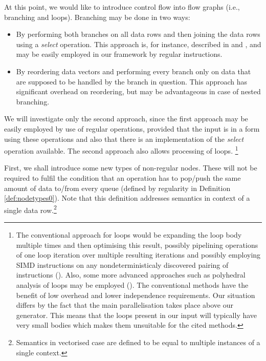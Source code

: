 \label{sec:analysis}

At this point, we would like to introduce control flow into flow graphs (i.e., branching and loops). Branching may be done in two ways:

\label{sec:branching}
\begin{itemize}
  \item By performing both branches on all data rows and then joining the data rows using a \emph{select} operation. This approach is, for instance, described in \cite{select} and \cite{select2}, and may be easily employed in our framework by regular instructions. 
  \item By reordering data vectors and performing every branch only on data that are supposed to be handled by the branch in question. This approach has significant overhead on reordering, but may be advantageous in case of nested branching.
\end{itemize}

We will investigate only the second approach, since the first approach may be easily employed by use of regular operations, provided that the input is in a form using these operations and also that there is an implementation of the \emph{select} operation available. The second approach also allows processing of loops. \footnote{The conventional approach for loops would be expanding the loop body multiple times and then optimising this result, possibly pipelining operations of one loop iteration over multiple resulting iterations and possibly employing SIMD instructions on any nondeterministicaly discovered pairing of instructions (\cite{compilers}). Also, some more advanced approaches such as polyhedral analysis of loops may be employed (\cite{polyhedra}). The conventional methods have the benefit of low overhead and lower independence requirements. Our situation differs by the fact that the main parallelisation takes place above our generator. This means that the loops present in our input will typically have very small bodies which makes them unsuitable for the cited methods. }

\label{sec:node_types}

First, we shall introduce some new types of non-regular nodes. These will not be required to fulfil the condition that an operation has to pop/push the same amount of data to/from every queue (defined by regularity in Definition \ref{def:nodetypes0}). Note that this definition addresses semantics in context of a single data row.\footnote{Semantics in vectorised case are defined to be equal to multiple instances of a single context.}

